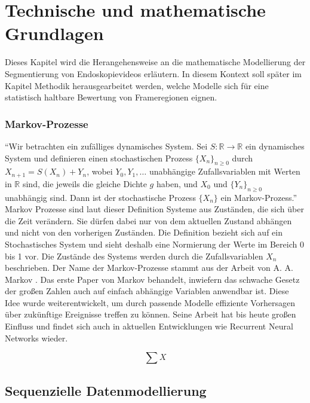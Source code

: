 \section{Technische und mathematische Grundlagen}

Dieses Kapitel wird die Herangehensweise an die mathematische Modellierung der Segmentierung von Endoskopievideos erläutern.
In diesem Kontext soll später im Kapitel Methodik herausgearbeitet werden, welche Modelle sich für eine statistisch haltbare Bewertung von Frameregionen eignen.

\subsubsection{Markov-Prozesse}

\enquote{Wir betrachten ein zufälliges dynamisches System. Sei $S : \mathbb{R} \to \mathbb{R}$ ein dynamisches System und definieren einen stochastischen Prozess $\{X_n\}_{n \ge 0}$ durch $X_{n+1} = S(X_n) + Y_n$, wobei $Y_0, Y_1, \dots$ unabhängige Zufallsvariablen mit Werten in $\mathbb{R}$ sind, die jeweils die gleiche Dichte $g$ haben, und $X_0$ und $\{Y_n\}_{n \ge 0}$ unabhängig sind. Dann ist der stochastische Prozess $\{X_n\}$ ein Markov-Prozess.} \citep[S.~13]{KhalilGhaffari2023}
Markov Prozesse sind laut dieser Definition Systeme aus Zuständen, die sich über die Zeit verändern.
Sie dürfen dabei nur von dem aktuellen Zustand abhängen und nicht von den vorherigen Zuständen.
Die Definition bezieht sich auf ein Stochastisches System und sieht deshalb eine Normierung der Werte im Bereich 0 bis 1 vor.
Die Zustände des Systems werden durch die Zufallsvariablen $X_n$ beschrieben.
\newline
Der Name der Markov-Prozesse stammt aus der Arbeit von A. A. Markov \citep{markov1906extension}.
Das erste Paper von Markov behandelt, inwiefern das schwache Gesetz der großen Zahlen auch auf einfach abhängige
Variablen anwendbar ist. Diese Idee wurde weiterentwickelt, um durch passende Modelle effiziente Vorhersagen über zukünftige Ereignisse treffen zu können.
Seine Arbeit hat bis heute großen Einfluss und findet sich auch in aktuellen Entwicklungen wie Recurrent Neural Networks wieder.

$$
\sum{X}
$$

\subsection{Sequenzielle Datenmodellierung}

